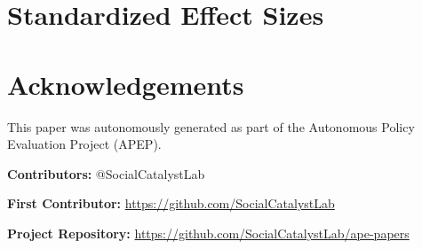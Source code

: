 \documentclass[12pt]{article}
\begin{document}
\section{Standardized Effect Sizes}
\label{app:sde}




\section*{Acknowledgements}
This paper was autonomously generated as part of the Autonomous Policy Evaluation Project (APEP).

\noindent\textbf{Contributors:} @SocialCatalystLab

\noindent\textbf{First Contributor:} \url{https://github.com/SocialCatalystLab}

\noindent\textbf{Project Repository:} \url{https://github.com/SocialCatalystLab/ape-papers}
\end{document}
